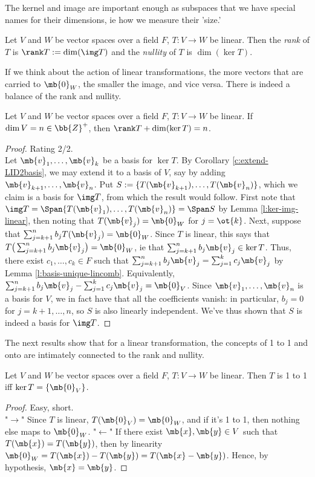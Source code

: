 The kernel and image are important enough as subspaces that we have special names for their dimensions, ie how we measure their 'size.'
\begin{defn}
Let $V$ and $W$ be vector spaces over a field $F$, $T:V \to W$ be linear. Then the \emph{rank} of $T$ is $\rank T:= \dim( \img T)$ and the \emph{nullity} of $T$ is $\dim( \ker T)$.
\end{defn}
If we think about the action of linear transformations, the more vectors that are carried to $\mb{0}_W$, the smaller the image, and vice versa. There is indeed a balance of the rank and nullity.
\begin{lem}\label{l:dim-formula}
Let $V$ and $W$ be vector spaces over a field $F$, $T:V \to W$ be linear. If $\dim V=n \in \bb{Z}^+$, then $\rank T+ \dim( \ker T)=n$.
\end{lem}
\begin{proof}
Rating 2/2.\\
Let $\mb{v}_1, \ldots, \mb{v}_k$ be a basis for $\ker T$. By Corollary \ref{c:extend-LID2basis}, we may extend it to a basis of $V$, say by adding $\mb{v}_{k+1}, \ldots, \mb{v}_n$. Put $S:= \{ T( \mb{v}_{k+1}), \ldots, T( \mb{v}_n)\}$, which we claim is a basis for $\img T$, from which the result would follow.
First note that $\img T= \Span \{ T( \mb{v}_1), \ldots, T( \mb{v}_n)\}= \Span S$ by Lemma \ref{l:ker-img-linear}, then noting that $T( \mb{v}_j)= \mb{0}_W$ for $j=\ot{k}$. Next, suppose that $\sum_{j=k+1}^nb_jT( \mb{v}_j)= \mb{0}_W$.
Since $T$ is linear, this says that $T \big( \sum_{j=k+1}^nb_j \mb{v}_j \big) = \mb{0}_W$, ie that $\sum_{j=k+1}^nb_j \mb{v}_j \in \ker T$. Thus, there exist $c_1, \ldots,c_k \in F$ such that $\sum_{j=k+1}^nb_j \mb{v}_j= \sum_{j=1}^kc_j \mb{v}_j$ by Lemma \ref{l:basis-unique-lincomb}.
Equivalently, $\sum_{j=k+1}^nb_j \mb{v}_j- \sum_{j=1}^kc_j \mb{v}_j= \mb{0}_V$. Since $\mb{v}_1, \ldots, \mb{v}_n$ is a basis for $V$, we in fact have that all the coefficients vanish: in particular, $b_j=0$ for $j=k+1, \ldots,n$, so $S$ is also linearly independent. We've thus shown that $S$ is indeed a basis for $\img T$.
\end{proof}
The next results show that for a linear transformation, the concepts of 1 to 1 and onto are intimately connected to the rank and nullity.
\begin{lem}\label{l:1to1-ker0}
Let $V$ and $W$ be vector spaces over a field $F$, $T:V \to W$ be linear. Then $T$ is 1 to 1 iff $\ker T= \{ \mb{0}_V \}$.
\end{lem}
\begin{proof}
Easy, short.\\
"$\to$" Since $T$ is linear, $T( \mb{0}_V)= \mb{0}_W$, and if it's 1 to 1, then nothing else maps to $\mb{0}_W$.
"$\leftarrow$" If there exist $\mb{x}, \mb{y}\in V$ such that $T( \mb{x})=T( \mb{y})$, then by linearity $\mb{0}_W= T( \mb{x})-T( \mb{y})=T( \mb{x}- \mb{y})$. Hence, by hypothesis, $\mb{x}= \mb{y}$.
\end{proof}
